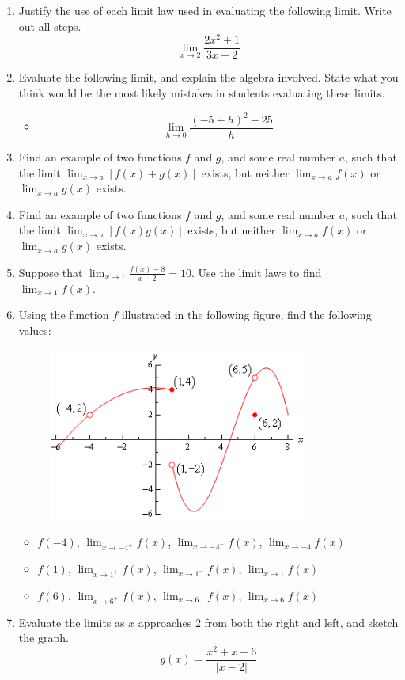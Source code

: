 \documentclass[11pt]{article}
\begin{document}
\begin{enumerate}
\item Justify the use of each limit law used in evaluating the following limit. Write out all steps.
$$\lim_{x \rightarrow 2} \frac{2x^2 + 1}{3x-2}$$
\item Evaluate the following limit, and explain the algebra involved. State what you think would be the most likely mistakes in students evaluating these limits.
\begin{itemize}
\item $$\lim_{h \rightarrow 0} \frac{(-5 + h)^2 - 25}{h}$$

\end{itemize}
\item Find an example of two functions $f$ and $g$, and some real number $a$, such that the limit $\lim_{x \rightarrow a} [f(x) + g(x)]$ exists, but neither $\lim_{x \rightarrow a} f(x)$ or $\lim_{x \rightarrow a} g(x)$ exists.
\item Find an example of two functions $f$ and $g$, and some real number $a$, such that the limit $\lim_{x \rightarrow a} [f(x)g(x)]$ exists, but neither $\lim_{x \rightarrow a} f(x)$ or $\lim_{x \rightarrow a} g(x)$ exists.
\item Suppose that $\lim_{x \rightarrow 1} \frac{f(x) - 8}{x-2} = 10$. Use the limit laws to find $\lim_{x \rightarrow 1} f(x)$.
\item Using the function $f$ illustrated in the following figure, find the following values:
\begin{figure}[h]
\centering
\includegraphics[width=0.8\textwidth]{image004_}
\end{figure}
\begin{itemize}
\item $f(-4)$, $\lim_{x \rightarrow -4^+} f(x)$, $\lim_{x\rightarrow -4^-} f(x)$, $\lim_{x\rightarrow -4} f(x)$
\item $f(1)$, $\lim_{x \rightarrow 1^+} f(x)$, $\lim_{x\rightarrow 1^-} f(x)$, $\lim_{x\rightarrow 1} f(x)$
\item $f(6)$, $\lim_{x \rightarrow 6^+} f(x)$, $\lim_{x\rightarrow 6^-} f(x)$, $\lim_{x\rightarrow 6} f(x)$
\end{itemize}
\item Evaluate the limits as $x$ approaches 2 from both the right and left, and sketch the graph.
$$g(x) = \frac{x^2 + x - 6}{|x-2|}$$
\end{enumerate}
\end{document}
